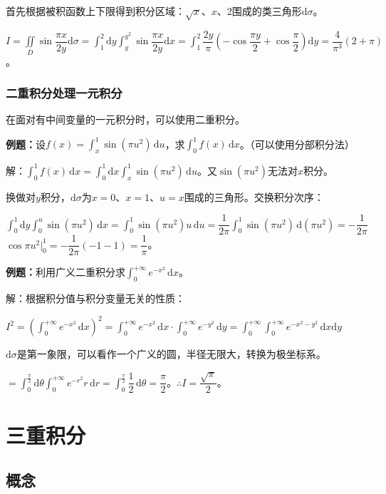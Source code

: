 \documentclass[UTF8, 12pt]{ctexart}
\begin{document}
首先根据被积函数上下限得到积分区域：$\sqrt{x}$、$x$、2围成的类三角形$\textrm{d}\sigma$。

$I=\displaystyle{\iint\limits_D\sin\dfrac{\pi x}{2y}\textrm{d}\sigma}=\displaystyle{\int_1^2\textrm{d}y\int_y^{y^2}\sin\dfrac{\pi x}{2y}\textrm{d}x}=\displaystyle{\int_1^2\dfrac{2y}{\pi}\left(-\cos\dfrac{\pi y}{2}+\cos\dfrac{\pi}{2}\right)}\textrm{d}y=\dfrac{4}{\pi^3}(2+\pi)$。

\subsubsection{二重积分处理一元积分}

在面对有中间变量的一元积分时，可以使用二重积分。

\textbf{例题：}设$f(x)=\int_x^1\sin(\pi u^2)\,\textrm{d}u$，求$\int_0^1f(x)\,\textrm{d}x$。（可以使用分部积分法）

解：$\int_0^1f(x)\,\textrm{d}x=\int_0^1\textrm{d}x\int_x^1\sin(\pi u^2)\,\textrm{d}u$。又$\sin(\pi u^2)$无法对$x$积分。

换做对$y$积分，$\textrm{d}\sigma$为$x=0$、$x=1$、$u=x$围成的三角形。交换积分次序：

$\int_0^1\textrm{d}y\int_0^u\sin(\pi u^2)\,\textrm{d}x=\int_0^1\sin(\pi u^2)u\,\textrm{d}u=\dfrac{1}{2\pi}\int_0^1\sin(\pi u^2)\,\textrm{d}(\pi u^2)=-\dfrac{1}{2\pi}$\\$\cos\pi u^2|_0^1=-\dfrac{1}{2\pi}(-1-1)=\dfrac{1}{\pi}$。

\textbf{例题：}利用广义二重积分求$\int_0^{+\infty}e^{-x^2}\,\textrm{d}x$。

解：根据积分值与积分变量无关的性质：

$I^2=(\int_0^{+\infty}e^{-x^2}\,\textrm{d}x)^2=\int_0^{+\infty}e^{-x^2}\,\textrm{d}x\cdot\int_0^{+\infty}e^{-y^2}\,\textrm{d}y=\int_0^{+\infty}\int_0^{+\infty}e^{-x^2-y^2}\,\textrm{d}x\textrm{d}y$

$\textrm{d}\sigma$是第一象限，可以看作一个广义的圆，半径无限大，转换为极坐标系。

$=\int_0^\frac{\pi}{2}\textrm{d}\theta\int_0^{+\infty}e^{-r^2}r\,\textrm{d}r=\displaystyle{\int_0^\frac{\pi}{2}\dfrac{1}{2}\,\textrm{d}\theta}=\dfrac{\pi}{2}$。$\therefore I=\dfrac{\sqrt{\pi}}{2}$。

\section{三重积分}

\subsection{概念}
\end{document}
